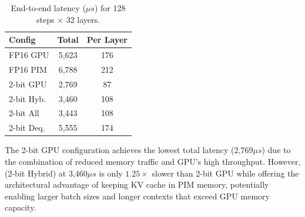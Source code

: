 \begin{table}[t]
\caption{End-to-end latency ($\mu s$) for 128 steps $\times$ 32 layers.}
\label{tab:e2e}
\centering
\small
\begin{tabular}{lcc}
\toprule
\textbf{Config} & \textbf{Total} & \textbf{Per Layer} \\
\midrule
FP16 GPU   & 5,623  & 176 \\
FP16 PIM   & 6,788  & 212 \\
2-bit GPU  & 2,769  & 87  \\
2-bit Hyb. & 3,460  & 108 \\
2-bit All  & 3,443  & 108 \\
2-bit Deq. & 5,555  & 174 \\
\bottomrule
\end{tabular}
\end{table}

The 2-bit GPU configuration achieves the lowest total latency (2,769$\mu s$) due to the combination of reduced memory traffic and GPU's high throughput.
However, \pimattn{} (2-bit Hybrid) at 3,460$\mu s$ is only $1.25\times$ slower than 2-bit GPU while offering the architectural advantage of keeping KV cache in PIM memory, potentially enabling larger batch sizes and longer contexts that exceed GPU memory capacity.

